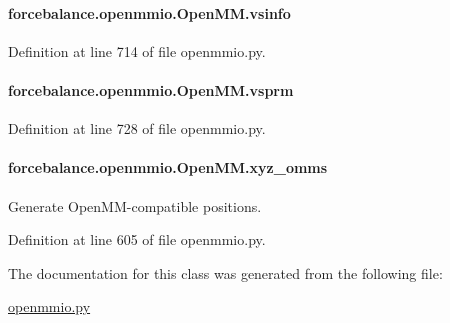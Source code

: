 \hypertarget{classforcebalance_1_1openmmio_1_1OpenMM_a599ce591c5f66aabf1b45dad7798397b}{
\paragraph[{vsinfo}]{\setlength{\rightskip}{0pt plus 5cm}forcebalance.\-openmmio.\-Open\-M\-M.\-vsinfo}}\label{classforcebalance_1_1openmmio_1_1OpenMM_a599ce591c5f66aabf1b45dad7798397b}


Definition at line 714 of file openmmio.\-py.

\hypertarget{classforcebalance_1_1openmmio_1_1OpenMM_ab8ec6fc24b2b1b0264c384ffdf14b5e2}{
\paragraph[{vsprm}]{\setlength{\rightskip}{0pt plus 5cm}forcebalance.\-openmmio.\-Open\-M\-M.\-vsprm}}\label{classforcebalance_1_1openmmio_1_1OpenMM_ab8ec6fc24b2b1b0264c384ffdf14b5e2}


Definition at line 728 of file openmmio.\-py.

\hypertarget{classforcebalance_1_1openmmio_1_1OpenMM_a66bf0f7944c5265a95594151b0840ebf}{
\paragraph[{xyz\-\_\-omms}]{\setlength{\rightskip}{0pt plus 5cm}forcebalance.\-openmmio.\-Open\-M\-M.\-xyz\-\_\-omms}}\label{classforcebalance_1_1openmmio_1_1OpenMM_a66bf0f7944c5265a95594151b0840ebf}


Generate Open\-M\-M-\/compatible positions. 



Definition at line 605 of file openmmio.\-py.



The documentation for this class was generated from the following file\-:\begin{DoxyCompactItemize}
\item 
\hyperlink{openmmio_8py}{openmmio.\-py}\end{DoxyCompactItemize}
